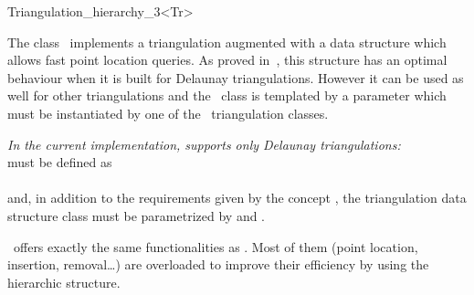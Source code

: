 

\begin{ccRefClass}{Triangulation_hierarchy_3<Tr>}

\ccDefinition
The class \ccRefName\ implements a triangulation augmented with
a data structure which allows fast point location queries.
As proved in~\cite{d-iirdt-98}, this structure has an optimal behaviour
when it is built for Delaunay triangulations.
However it can be used as well for other triangulations
and the \ccRefName\ class is templated by a parameter
which must be instantiated by one of the \cgal\ triangulation
classes.

\textit{In the current implementation,  
supports only Delaunay triangulations:}\\
 must be defined as\\
\\
and, in addition to the requirements given by the concept
, the triangulation data structure
class must be parametrized by 
and .


\ccInheritsFrom


\ccRefName\ offers exactly the same functionalities as .
Most of them (point location, insertion, removal\ldots) are overloaded to
improve their efficiency by using the hierarchic structure. 





\end{ccRefClass}
